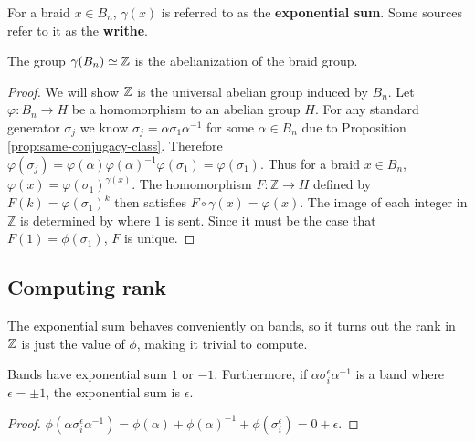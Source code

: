 \documentclass[12pt]{thesis}
\begin{document}
\begin{definition}
    For a braid $x \in B_{n}$,
    $\gamma(x)$ is referred to as the \textbf{exponential sum}.
    Some sources refer to it as the \textbf{writhe}.
\end{definition}

\begin{proposition}
    The group $\gamma(B_{n}) \simeq \mathbb{Z}$ is the abelianization of the braid group.
\end{proposition}

\begin{proof}
    We will show $\mathbb{Z}$ is the universal abelian group induced by $B_{n}$.
    Let $\varphi \colon B_{n} \rightarrow H$ be a homomorphism to an abelian group $H$.
    For any standard generator $\sigma_{j}$ we know $\sigma_{j} = \alpha \sigma_{1} \alpha^{-1}$ 
    for some $\alpha \in B_{n}$ due to Proposition \ref{prop:same-conjugacy-class}.
    Therefore $\varphi(\sigma_{j}) = \varphi(\alpha)\varphi(\alpha)^{-1} \varphi(\sigma_{1}) = \varphi(\sigma_{1})$.
    Thus for a braid $x \in B_{n}$, $\varphi(x) = \varphi(\sigma_{1})^{\gamma(x)}$.
    The homomorphism $F \colon \mathbb{Z} \rightarrow H$ defined by $F(k) = \varphi(\sigma_{1})^{k}$
    then satisfies $F \circ \gamma(x) = \varphi(x)$.
    The image of each integer in $\mathbb{Z}$ is determined by where $1$ is sent.
    Since it must be the case that $F(1) = \phi(\sigma_{1})$, $F$ is unique.
\end{proof}

\subsection{Computing rank}

The exponential sum behaves conveniently on bands,
so it turns out the rank in $\mathbb{Z}$ is just the value of $\phi$,
making it trivial to compute.

\begin{proposition}
    \label{prop:exponential-sum-of-band}
Bands have exponential sum $1$ or $-1$.
Furthermore, if $\alpha \sigma_{i}^{\epsilon} \alpha^{-1}$ is a band where $\epsilon = \pm 1$,
the exponential sum is $\epsilon$.
\end{proposition}

\begin{proof}
$\phi(\alpha \sigma_{i}^{\epsilon}\alpha^{-1}) = \phi(\alpha) + \phi(\alpha)^{-1} + \phi(\sigma_{i}^{\epsilon}) = 0 + \epsilon$.
\end{proof}
\end{document}
